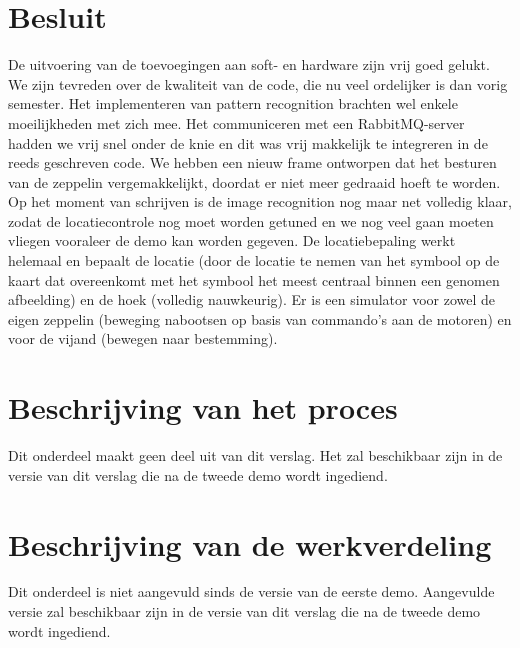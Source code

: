 \documentclass[eind]{penoverslag}
\begin{document}
\section{Besluit}
De uitvoering van de toevoegingen aan soft- en hardware zijn vrij goed gelukt. We zijn tevreden over de kwaliteit van de code, die nu veel ordelijker is dan vorig semester. Het implementeren van pattern recognition brachten wel enkele moeilijkheden met zich mee. Het communiceren met een RabbitMQ-server hadden we vrij snel onder de knie en dit was vrij makkelijk te integreren in de reeds geschreven code. We hebben een nieuw frame ontworpen dat het besturen van de zeppelin vergemakkelijkt, doordat er niet meer gedraaid hoeft te worden. Op het moment van schrijven is de image recognition nog maar net volledig klaar, zodat de locatiecontrole nog moet worden getuned en we nog veel gaan moeten vliegen vooraleer de demo kan worden gegeven. De locatiebepaling werkt helemaal en bepaalt de locatie (door de locatie te nemen van het symbool op de kaart dat overeenkomt met het symbool het meest centraal binnen een genomen afbeelding) en de hoek (volledig nauwkeurig). Er is een simulator voor zowel de eigen zeppelin (beweging nabootsen op basis van commando's aan de motoren) en voor de vijand (bewegen naar bestemming).


\newpage\makeappendix

\section{Beschrijving van het proces}
Dit onderdeel maakt geen deel uit van dit verslag. Het zal beschikbaar zijn in de versie van dit verslag die na de tweede demo wordt ingediend.


\section{Beschrijving van de werkverdeling}
Dit onderdeel is niet aangevuld sinds de versie van de eerste demo. Aangevulde versie zal beschikbaar zijn in de versie van dit verslag die na de tweede demo wordt ingediend.
\end{document}
